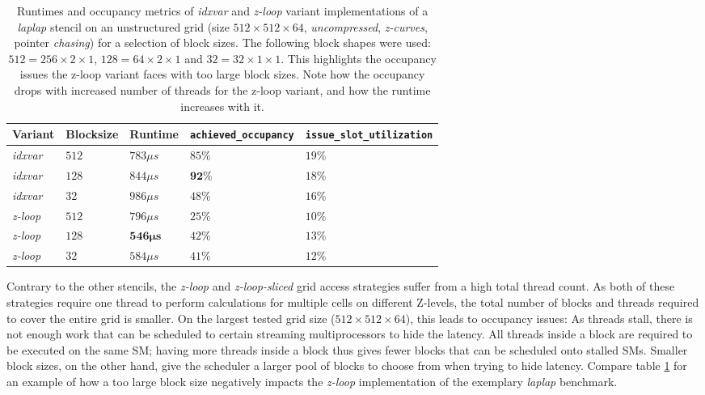 \begin{table}
	\begin{center}
    \begin{tabular}{l l l p{2.5cm} p{2.5cm}}
        \hline
        \textbf{Variant} & \textbf{Blocksize} & \textbf{Runtime} & \textbf{\texttt{achieved\_\allowbreak occupancy}} & \textbf{\texttt{issue\_\allowbreak slot\_\allowbreak utilization}} \\
        \hline
        \hline
        \emph{idxvar} & $512$ & $783\mu s$ & $85\%$ & $19\%$ \\
        \emph{idxvar} & $128$ & $844\mu s$ & $\mathbf{92\%}$ & $18\%$ \\
        \emph{idxvar} & $32$  & $986\mu s$ & $48\%$ & $16\%$ \\
        \emph{z-loop} & $512$ & $796\mu s$ & $25\%$ & $10\%$\\
        \emph{z-loop} & $128$ & $\mathbf{546\mu s}$ & $42\%$ & $13\%$ \\ 
        \emph{z-loop} & $32$  & $584\mu s$ & $41\%$ & $12\%$ \\
        \hline
    \end{tabular}
	\end{center}
    \caption{\label{tab:laplap-blocksize-occupancy} Runtimes and occupancy metrics of \emph{idxvar} and \emph{z-loop} variant implementations of a \emph{laplap} stencil on an unstructured grid (size $512\times 512\times 64$, \emph{uncompressed}, \emph{z-curves}, pointer \emph{chasing}) for a selection of block sizes. The following block shapes were used: $512 = 256\times 2\times 1$, $128 = 64\times 2\times 1$ and $32 = 32\times 1 \times 1$. This highlights the occupancy issues the z-loop variant faces with too large block sizes. Note how the occupancy drops with increased number of threads for the z-loop variant, and how the runtime increases with it.}
\end{table}

Contrary to the other stencils, the \emph{z-loop} and \emph{z-loop-sliced} grid access strategies suffer from a high total thread count. As both of these strategies require one thread to perform calculations for multiple cells on different Z-levels, the total number of blocks and threads required to cover the entire grid is smaller. On the largest tested grid size ($512\times 512\times 64$), this leads to occupancy issues: As threads stall, there is not enough work that can be scheduled to certain streaming multiprocessors to hide the latency. All threads inside a block are required to be executed on the same SM; having more threads inside a block thus gives fewer blocks that can be scheduled onto stalled SMs. Smaller block sizes, on the other hand, give the scheduler a larger pool of blocks to choose from when trying to hide latency. Compare table \ref{tab:laplap-blocksize-occupancy} for an example of how a too large block size negatively impacts the \emph{z-loop} implementation of the exemplary \emph{laplap} benchmark.